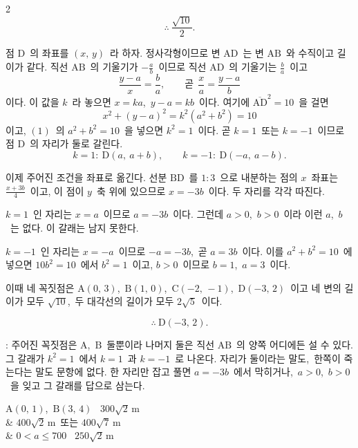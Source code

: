 \documentclass[10pt,fleqn]{article}
\begin{document}
\begin{multicols*}{2}
$$\therefore\ \dfrac{\sqrt{10}}{2}.$$

 점 $\mathrm{D}$\ 의 좌표를 $(x,\,y)$\ 라 하자. 정사각형이므로 변 $\mathrm{AD}$\ 는 변 $\mathrm{AB}$\ 와 수직이고 길이가 같다. 직선 $\mathrm{AB}$\ 의 기울기가 $-\frac{a}{b}$\ 이므로 직선 $\mathrm{AD}$\ 의 기울기는 $\frac{b}{a}$\ 이고
$$\dfrac{y-a}{x}=\dfrac{b}{a},\qquad \text{곧}\ \ \dfrac{x}{a}=\dfrac{y-a}{b}$$
이다. 이 값을 $k$\ 라 놓으면 $x=ka$,\ $y-a=kb$\ 이다. 여기에 $\overline{\mathrm{AD}}^{2}=10$\ 을 걸면
$$x^{2}+(y-a)^{2}=k^{2}(a^{2}+b^{2})=10$$
이고, $(1)$\ 의 $a^{2}+b^{2}=10$\ 을 넣으면 $k^{2}=1$\ 이다. 곧 $k=1$\ 또는 $k=-1$\ 이므로 점 $\mathrm{D}$\ 의 자리가 둘로 갈린다.
$$k=1:\ \mathrm{D}(a,\ a+b),\qquad k=-1:\ \mathrm{D}(-a,\ a-b).$$

이제 주어진 조건을 좌표로 옮긴다. 선분 $\mathrm{BD}$\ 를 $1:3$\ 으로 내분하는 점의 $x$\ 좌표는 $\frac{x+3b}{4}$\ 이고, 이 점이 $y$\ 축 위에 있으므로 $x=-3b$\ 이다. 두 자리를 각각 따진다.

$k=1$\ 인 자리는 $x=a$\ 이므로 $a=-3b$\ 이다. 그런데 $a>0$,\ $b>0$\ 이라 이런 $a$,\ $b$\ 는 없다. 이 갈래는 남지 못한다.

$k=-1$\ 인 자리는 $x=-a$\ 이므로 $-a=-3b$,\ 곧 $a=3b$\ 이다. 이를 $a^{2}+b^{2}=10$\ 에 넣으면 $10b^{2}=10$\ 에서 $b^{2}=1$\ 이고, $b>0$\ 이므로 $b=1$,\ $a=3$\ 이다.

이때 네 꼭짓점은 $\mathrm{A}(0,\,3)$,\ $\mathrm{B}(1,\,0)$,\ $\mathrm{C}(-2,\,-1)$,\ $\mathrm{D}(-3,\,2)$\ 이고 네 변의 길이가 모두 $\sqrt{10}$,\ 두 대각선의 길이가 모두 $2\sqrt5$\ 이다.

$$\therefore\ \mathrm{D}(-3,\,2).$$

\begin{dmcriticalpoint}
: 주어진 꼭짓점은 $\mathrm{A}$,\ $\mathrm{B}$\ 둘뿐이라 나머지 둘은 직선 $\mathrm{AB}$\ 의 양쪽 어디에든 설 수 있다. 그 갈래가 $k^{2}=1$\ 에서 $k=1$\ 과 $k=-1$\ 로 나온다. 자리가 둘이라는 말도,\ 한쪽이 죽는다는 말도 문항에 없다. 한 자리만 잡고 풀면 $a=-3b$\ 에서 막히거나,\ $a>0$,\ $b>0$\ 을 잊고 그 갈래를 답으로 삼는다.
\end{dmcriticalpoint}


\begin{dmanslist}
 $\mathrm{A}(0,\,1)$,\ $\mathrm{B}(3,\,4)$ \textperiodcentered\ $300\sqrt2\,\mathrm{m}$\\
&  $400\sqrt2\,\mathrm{m}$\ 또는 $400\sqrt7\,\mathrm{m}$\\
&  $0<a\le 700$ \textperiodcentered\ $250\sqrt2\,\mathrm{m}$
\end{dmanslist}


\end{multicols*}
\end{document}
